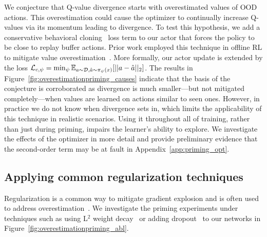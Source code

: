We conjecture that Q-value divergence starts with overestimated values of OOD actions. This overestimation could cause the optimizer to continually increase Q-values via its momentum leading to divergence. 
To test this hypothesis, we add a conservative behavioral cloning~\parencite{pomerleau1988alvinn, atkeson1997robot} loss term to our actor that forces the policy to be close to replay buffer actions. Prior work employed this technique in offline RL to mitigate value overestimation~\parencite{fujimoto2021td3bc}. More formally, our actor update is extended by the loss $
        \mathcal{L}_{c, \psi} = \min_{\psi} \mathbb{E}_{a \sim \mathcal{D}, \hat{a} \sim \pi_{\psi}(x)}[||a - \hat{a}||_2]$. 
The results in Figure~\ref{fig:overestimationpriming_causes} indicate that the basis of the conjecture is corroborated as divergence is much smaller---but not mitigated completely---when values are learned on actions similar to seen ones. However, in practice we do not know when divergence sets in, which limits the applicability of this technique in realistic scenarios. Using it throughout all of training, rather than just during priming, impairs the learner's ability to explore. We investigate the effects of the optimizer in more detail and provide preliminary evidence that the second-order term may be at fault in Appendix~\ref{app:priming_opt}. 




\subsection{Applying common regularization techniques} \label{sec:regularization}

Regularization is a common way to mitigate gradient explosion and is  often used to address overestimation~\parencite{farebrother2018generalization, chen2021randomized, liu2021regularization, hiraoka2022dropout, li2023efficient}. We investigate the priming experiments under techniques such as using L$^2$ weight decay~\parencite{krogh1991simple} or adding dropout~\parencite{srivastava14dropout} to our networks in Figure~\ref{fig:overestimationpriming_abl}.

